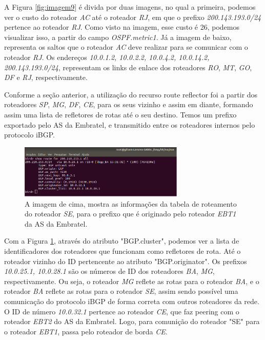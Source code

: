 \documentclass[12pt,a4paper]{report}
\begin{document}
A Figura \ref{fig:imagem9} \'e divida por duas imagens, no qual a primeira, podemos ver o custo do roteador \textit{AC} at\'e o roteador \textit{RJ}, em que o prefixo \textit{200.143.193.0/24} pertence ao roteador \textit{RJ}. Como visto na imagem, esse custo \'e 26, podemos visualizar isso, a partir do campo \textit{OSPF.metric1}. J\'a a imagem de baixo, representa os saltos que o roteador \textit{AC} deve realizar para se comunicar com o roteador \textit{RJ}. Os endere\c{c}os \textit{10.0.1.2, 10.0.2.2, 10.0.4.2, 10.0.14.2, 200.143.193.0/24}, representam os links de enlace dos roteadores \textit{RO}, \textit{MT}, \textit{GO}, \textit{DF} e \textit{RJ}, respectivamente.

Conforme a se\c{c}\~ao anterior, a utiliza\c{c}\~ao do recurso route reflector foi a partir dos roteadores \textit{SP}, \textit{MG}, \textit{DF}, \textit{CE}, para os seus vizinho e assim em diante, formando assim uma lista de refletores de rotas at\'e o seu destino. Temos um prefixo exportado pelo AS da Embratel, e transmitido entre os roteadores internos pelo protocolo iBGP.

\begin{figure}[!htb]
 \centering
 \includegraphics[width=0.7\textwidth]{Imagens/ROUTERREFLECTOR}
  \caption{\label{fig:routerreflector} A imagem de cima, mostra as informa\c{c}\~oes da tabela de roteamento do roteador \textit{SE}, para o prefixo que \'e originado pelo roteador \textit{EBT1} da AS da Embratel.}
\end{figure}

Com a Figura \ref{fig:routerreflector}, atrav\'es do atributo "BGP.cluster", podemos ver a lista de identificadores dos roteadores que funcionam como refletores de rota. At\'e o roteador vizinho do ID pertencente ao atributo "BGP.originator". Os prefixos \textit{10.0.25.1, 10.0.28.1} s\~ao os n\'umeros de ID dos roteadores \textit{BA}, \textit{MG}, respectivamente. Ou seja, o roteador \textit{MG} reflete as rotas para o roteador \textit{BA}, e o roteador \textit{BA} reflete as rotas para o roteador \textit{SE}, assim sendo poss\'ivel uma comunica\c{c}\~ao do protocolo iBGP de forma correta com outros roteadores da rede. O ID de n\'umero \textit{10.0.32.1} pertence ao roteador \textit{CE}, que faz peering com o roteador \textit{EBT2} do AS da Embratel. Logo, para comuni\c{c}\~ao do roteador "SE" para o roteador \textit{EBT1}, passa pelo roteador de borda \textit{CE}.
\end{document}
